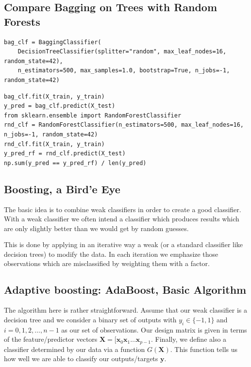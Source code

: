 \documentclass[%
oneside,                 %
final,                   %
10pt]{article}
\begin{document}
\subsection*{Compare  Bagging on Trees with Random Forests}
\begin{verbatim}
bag_clf = BaggingClassifier(
    DecisionTreeClassifier(splitter="random", max_leaf_nodes=16, random_state=42),
    n_estimators=500, max_samples=1.0, bootstrap=True, n_jobs=-1, random_state=42)
\end{verbatim}



\begin{verbatim}
bag_clf.fit(X_train, y_train)
y_pred = bag_clf.predict(X_test)
from sklearn.ensemble import RandomForestClassifier
rnd_clf = RandomForestClassifier(n_estimators=500, max_leaf_nodes=16, n_jobs=-1, random_state=42)
rnd_clf.fit(X_train, y_train)
y_pred_rf = rnd_clf.predict(X_test)
np.sum(y_pred == y_pred_rf) / len(y_pred) 
\end{verbatim}





\subsection*{Boosting, a Bird'e Eye}

The basic idea is to combine weak classifiers in order to create a good
classifier. With a weak classifier we often intend a classifier which
produces results which are only slightly better than we would get by
random guesses.

This is done by applying in an iterative way a weak (or a standard
classifier like decision trees) to modify the data. In each iteration
we emphasize those observations which are misclassified by weighting
them with a factor.


\subsection*{Adaptive boosting: AdaBoost, Basic Algorithm}

The algorithm here is rather straightforward. Assume that our weak
classifier is a decision tree and we consider a binary set of outputs
with $y_i \in \{-1,1\}$ and $i=0,1,2,\dots,n-1$ as our set of
observations. Our design matrix is given in terms of the
feature/predictor vectors
$\bm{X}=[\bm{x}_0\bm{x}_1\dots\bm{x}_{p-1}$. Finally, we define also a
classifier determined by our data via a function $G(\bm{X})$. This function tells us how well we are able to classify our outputs/targets $\bm{y}$. 
\end{document}
